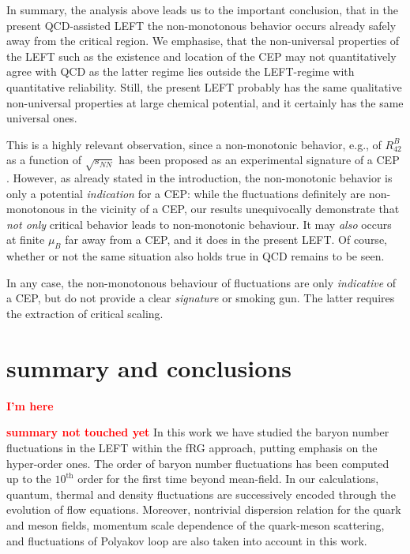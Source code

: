 \documentclass[%
reprint,
superscriptaddress,
showpacs,preprintnumbers,
amsmath,amssymb,
aps,
prd,
]{revtex4-1}
\newcommand{\coljan}[1]{\textcolor{red}{#1}}
\begin{document}
In summary, the analysis above leads us to the important conclusion, that in the present QCD-assisted LEFT the non-monotonous behavior occurs already safely away from the critical region. We emphasise, that  the non-universal properties of the LEFT such as the existence and location of the CEP may not quantitatively agree with QCD as the latter regime lies outside the LEFT-regime with quantitative reliability. Still, the present LEFT probably has the same qualitative non-universal properties at large chemical potential, and it certainly has the same universal ones. 

This is a highly relevant observation, since a non-monotonic behavior, e.g., of $R^{B}_{42}$ as a function of  $\sqrt{s_{NN}}$ has been proposed as an experimental signature of a CEP \cite{Stephanov:1999zu, Stephanov:2011pb}. However, as already stated in the introduction, the non-monotonic behavior is only a potential \textit{indication} for a CEP: while the fluctuations definitely are non-monotonous in the vicinity of a CEP, our results unequivocally demonstrate that \emph{not only} critical behavior  leads to non-monotonic behaviour. It may \emph{also} occurs at finite $\mu_B$ far away from a CEP, and it does in the present LEFT. Of course, whether or not the same situation also holds true in QCD remains to be seen. 

In any case, the non-monotonous behaviour of fluctuations are only \textit{indicative} of a CEP, but do not provide a clear \textit{signature} or smoking gun. The latter requires the extraction of critical scaling. 


	
	
	
	
\section{summary and conclusions}
\label{sec:summary}
	\coljan{\bf I'm here} 
	
\coljan{\bf summary not touched yet}
In this work we have studied the baryon number fluctuations in the LEFT within the fRG approach, putting emphasis on the hyper-order ones. The order of baryon number fluctuations has been computed up to the $10^{\mathrm{th}}$ order for the first time beyond mean-field. In our calculations, quantum, thermal and density fluctuations are successively encoded through the evolution of flow equations. Moreover, nontrivial dispersion relation for the quark and meson fields, momentum scale dependence of the quark-meson scattering, and fluctuations of Polyakov loop are also taken into account in this work.
	
\end{document}
